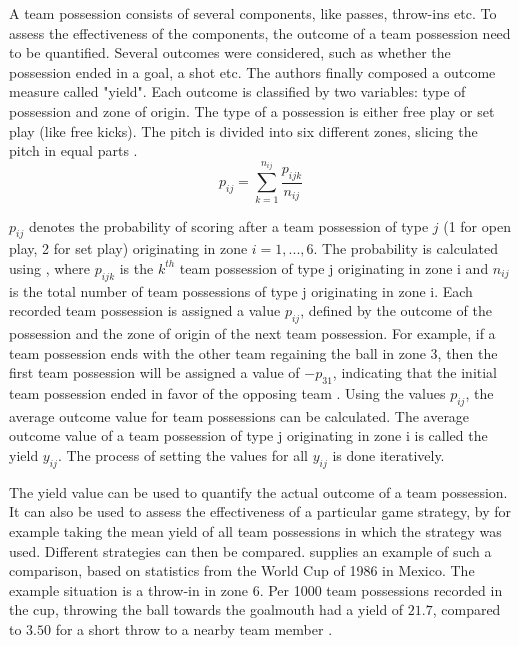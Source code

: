 A team possession consists of several components, like passes, throw-ins etc. To assess the effectiveness of the components, the outcome of a team possession need to be quantified. Several outcomes were considered, such as whether the possession ended in a goal, a shot etc. The authors finally composed a outcome measure called "yield". Each outcome is classified by two variables: type of possession and zone of origin. The type of a possession is either free play or set play (like free kicks). The pitch is divided into six different zones, slicing the pitch in equal parts \citep{bib:pollard-reep-1997}.
\begin{equation}
    p_{ij} = \sum_{k=1}^{n_{ij}} \frac{p_{ijk}}{n_{ij}}
    \label{eq:team-possession-probability}
\end{equation}

$p_{ij}$ denotes the probability of scoring after a team possession of type $j$ (1 for open play, 2 for set play) originating in zone $i = 1, ..., 6$. The probability is calculated using , where $p_{ijk}$ is the $k^{th}$ team possession of type j originating in zone i and $n_{ij}$ is the total number of team possessions of type j originating in zone i. Each recorded team possession is assigned a value $p_{ij}$, defined by the outcome of the possession and the zone of origin of the next team possession. For example, if a team possession ends with the other team regaining the ball in zone 3, then the first team possession will be assigned a value of $-p_{31}$, indicating that the initial team possession ended in favor of the opposing team \citep{bib:pollard-reep-1997}. Using the values $p_{ij}$, the average outcome value for team possessions can be calculated. The average outcome value of a team possession of type j originating in zone i is called the yield $y_{ij}$. The process of setting the values for all $y_{ij}$ is done iteratively.

The yield value can be used to quantify the actual outcome of a team possession. It can also be used to assess the effectiveness of a particular game strategy, by for example taking the mean yield of all team possessions in which the strategy was used. Different strategies can then be compared. \citet{bib:pollard-reep-1997} supplies an example of such a comparison, based on statistics from the World Cup of 1986 in Mexico. The example situation is a throw-in in zone 6. Per 1000 team possessions recorded in the cup, throwing the ball towards the goalmouth had a yield of $21.7$, compared to $3.50$ for a short throw to a nearby team member \citep{bib:pollard-reep-1997}.

